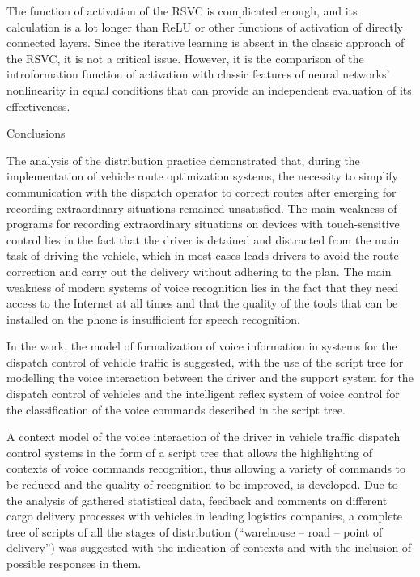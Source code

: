 The function of activation of the RSVC is complicated enough, and its calculation is a lot longer than ReLU or other functions of activation of directly connected layers. Since the iterative learning is absent in the classic approach of the RSVC, it is not a critical issue. However, it is the comparison of the introformation function of activation with classic features of neural networks’ nonlinearity in equal conditions that can provide an independent evaluation of its effectiveness. 


Conclusions

The analysis of the distribution practice demonstrated that, during the implementation of vehicle route optimization systems, the necessity to simplify communication with the dispatch operator to correct routes after emerging for recording extraordinary situations remained unsatisfied. The main weakness of programs for recording extraordinary situations on devices with touch-sensitive control lies in the fact that the driver is detained and distracted from the main task of driving the vehicle, which in most cases leads drivers to avoid the route correction and carry out the delivery without adhering to the plan. The main weakness of modern systems of voice recognition lies in the fact that they need access to the Internet at all times and that the quality of the tools that can be installed on the phone is insufficient for speech recognition. 

In the work, the model of formalization of voice information in systems for the dispatch control of vehicle traffic is suggested, with the use of the script tree for modelling the voice interaction between the driver and the support system for the dispatch control of vehicles and the intelligent reflex system of voice control for the classification of the voice commands described in the script tree. 

A context model of the voice interaction of the driver in vehicle traffic dispatch control systems in the form of a script tree that allows the highlighting of contexts of voice commands recognition, thus allowing a variety of commands to be reduced and the quality of recognition to be improved, is developed. Due to the analysis of gathered statistical data, feedback and comments on different cargo delivery processes with vehicles in leading logistics companies, a complete tree of scripts of all the stages of distribution (“warehouse – road – point of delivery”) was suggested with the indication of contexts and with the inclusion of possible responses in them. 


